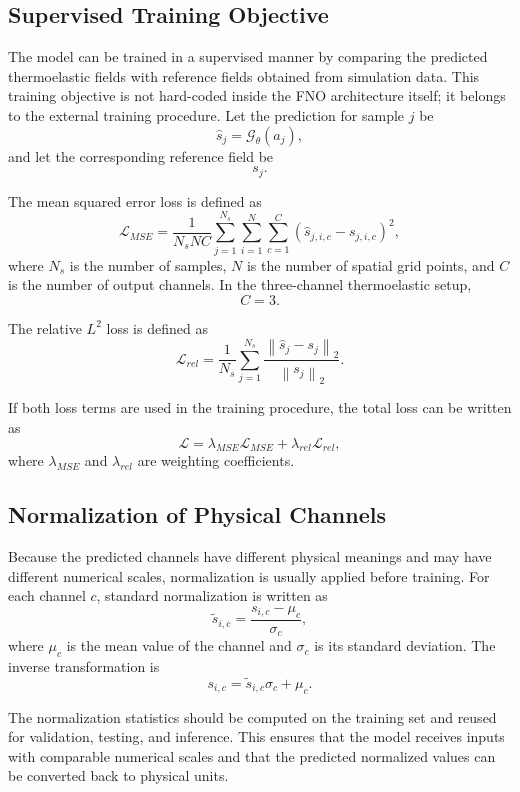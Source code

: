 \documentclass[14pt]{extarticle}
\begin{document}
\subsection{Supervised Training Objective}

The model can be trained in a supervised manner by comparing the predicted thermoelastic fields with reference fields obtained from simulation data. This training objective is not hard-coded inside the FNO architecture itself; it belongs to the external training procedure. Let the prediction for sample \(j\) be
\[
\hat{s}_j
=
\mathcal{G}_{\theta}(a_j),
\]
and let the corresponding reference field be
\[
s_j.
\]

The mean squared error loss is defined as
\[
\mathcal{L}_{MSE}
=
\frac{1}{N_sNC}
\sum_{j=1}^{N_s}
\sum_{i=1}^{N}
\sum_{c=1}^{C}
\left(
\hat{s}_{j,i,c}
-
s_{j,i,c}
\right)^2,
\]
where \(N_s\) is the number of samples, \(N\) is the number of spatial grid points, and \(C\) is the number of output channels. In the three-channel thermoelastic setup,
\[
C = 3.
\]

The relative \(L^2\) loss is defined as
\[
\mathcal{L}_{rel}
=
\frac{1}{N_s}
\sum_{j=1}^{N_s}
\frac{
\left\|
\hat{s}_j
-
s_j
\right\|_2
}{
\left\|
s_j
\right\|_2
}.
\]

If both loss terms are used in the training procedure, the total loss can be written as
\[
\mathcal{L}
=
\lambda_{MSE}\mathcal{L}_{MSE}
+
\lambda_{rel}\mathcal{L}_{rel},
\]
where \(\lambda_{MSE}\) and \(\lambda_{rel}\) are weighting coefficients.

\subsection{Normalization of Physical Channels}

Because the predicted channels have different physical meanings and may have different numerical scales, normalization is usually applied before training. For each channel \(c\), standard normalization is written as
\[
\tilde{s}_{i,c}
=
\frac{
s_{i,c}
-
\mu_c
}{
\sigma_c
},
\]
where \(\mu_c\) is the mean value of the channel and \(\sigma_c\) is its standard deviation. The inverse transformation is
\[
s_{i,c}
=
\tilde{s}_{i,c}\sigma_c
+
\mu_c.
\]

The normalization statistics should be computed on the training set and reused for validation, testing, and inference. This ensures that the model receives inputs with comparable numerical scales and that the predicted normalized values can be converted back to physical units.
\end{document}
